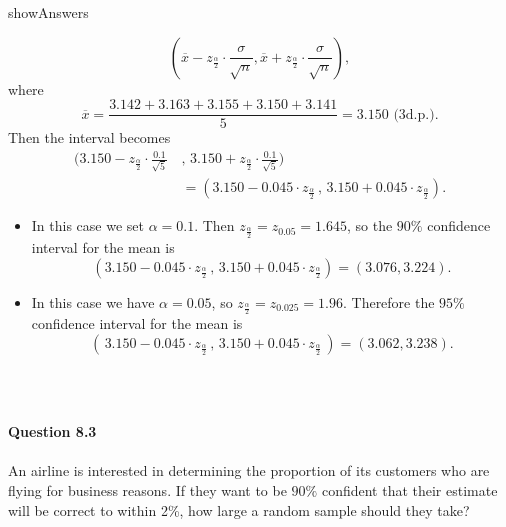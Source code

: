 \documentclass{article}
\begin{document}
\begin{maybePrint}{showAnswers}
{$$\left(\overline x-z_{\frac{\alpha}{2}}\cdot\frac{\sigma}{\sqrt{n}},\overline x+z_{\frac{\alpha}{2}}\cdot\frac{\sigma}{\sqrt{n}}\right),$$
where 
$$\overline x=\frac{3.142+3.163+3.155+3.150+3.141}{5}=3.150 \text{ (3d.p.)}.$$
Then the interval becomes
\begin{align*}
\bigg(3.150-z_{\frac{\alpha}{2}}\cdot\frac{0.1}{\sqrt{5}}\, & , \,3.150+z_{\frac{\alpha}{2}}\cdot\frac{0.1}{\sqrt{5}}\bigg)\\
&=\left(3.150-0.045\cdot z_{\frac{\alpha}{2}}\, , \, 3.150+0.045\cdot z_{\frac{\alpha}{2}}\right).
\end{align*}
\begin{itemize}
\item[(a)] In this case we set $\alpha=0.1$. Then $z_{\frac{\alpha}{2}}=z_{0.05}=1.645$, so the $90\%$ confidence interval for the mean is 
$$\left(3.150-0.045\cdot z_{\frac{\alpha}{2}}\, , \,3.150+0.045\cdot z_{\frac{\alpha}{2}}\right)=(3.076, 3.224).$$
\item[(b)] In this case we have $\alpha=0.05$, so $z_{\frac{\alpha}{2}}=z_{0.025}=1.96$. Therefore the $95\%$ confidence interval for the mean is 
$$\left(\, 3.150-0.045\cdot z_{\frac{\alpha}{2}}\, , \,3.150+0.045\cdot z_{\frac{\alpha}{2}}\, \right)=(3.062, 3.238).$$
\end{itemize}

}
~\\~\\
\end{maybePrint}
%
%
{\bf Question 8.3}
~\\~\\
An airline is interested in determining the proportion of its customers who are flying for business reasons. If they want to be $90\%$ confident that their estimate will be correct to within 2\%, how large a random sample should they take?
~\\~\\
\end{document}
